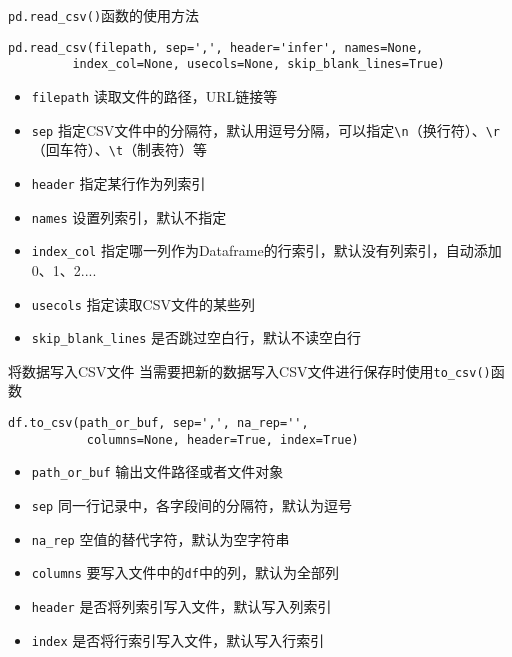 \documentclass[t]{beamer}
\begin{document}
\begin{frame}[fragile]{\texttt{pd.read\_csv()}函数的使用方法}
\begin{lstlisting}
pd.read_csv(filepath, sep=',', header='infer', names=None, 
         index_col=None, usecols=None, skip_blank_lines=True)   
\end{lstlisting}
\begin{itemize}
    \item \verb|filepath| 读取文件的路径，URL链接等
    \item \verb|sep| 指定CSV文件中的分隔符，默认用逗号分隔，可以指定\verb|\n|（换行符）、\verb|\r|（回车符）、\verb|\t|（制表符）等
    \item \verb|header| 指定某行作为列索引
    \item  \verb|names| 设置列索引，默认不指定
    \item \verb|index_col| 指定哪一列作为Dataframe的行索引，默认没有列索引，自动添加0、1、2....
    \item  \verb|usecols| 指定读取CSV文件的某些列
    \item  \verb|skip_blank_lines| 是否跳过空白行，默认不读空白行
\end{itemize}
\end{frame}


\begin{frame}[fragile]{将数据写入CSV文件}
    当需要把新的数据写入CSV文件进行保存时使用\verb|to_csv()|函数
\begin{lstlisting}
df.to_csv(path_or_buf, sep=',', na_rep='', 
           columns=None, header=True, index=True)
\end{lstlisting}
\begin{itemize}
    \item \verb|path_or_buf| 输出文件路径或者文件对象
    \item \verb|sep| 同一行记录中，各字段间的分隔符，默认为逗号
    \item \verb|na_rep| 空值的替代字符，默认为空字符串
    \item \verb|columns| 要写入文件中的\verb|df|中的列，默认为全部列
    \item \verb|header| 是否将列索引写入文件，默认写入列索引
    \item \verb|index| 是否将行索引写入文件，默认写入行索引
\end{itemize}
\end{frame}
\end{document}
